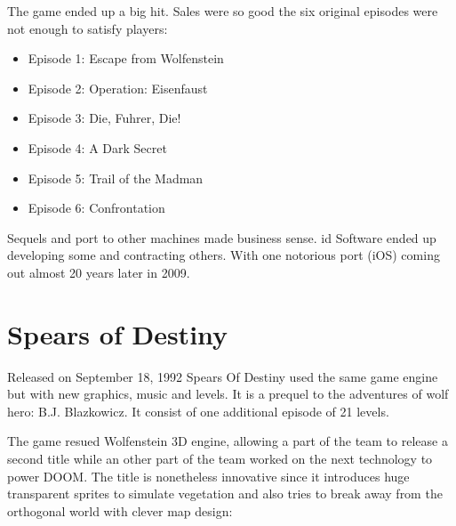 \documentclass[book.tex]{subfiles}
\begin{document}
The game ended up a big hit. Sales were so good the six original episodes were not enough to satisfy players:\\
\par
\begin{itemize}
\item Episode 1: Escape from Wolfenstein\\
\item Episode 2: Operation: Eisenfaust\\
\item Episode 3: Die, Fuhrer, Die!\\
\item Episode 4: A Dark Secret\\
\item Episode 5: Trail of the Madman\\
\item Episode 6: Confrontation\\
\end{itemize}
Sequels and port to other machines made business sense. id Software ended up developing some and contracting others. With one notorious port (iOS) coming out almost 20 years later in 2009.

\section{Spears of Destiny}
Released on September 18, 1992 Spears Of Destiny used the same game engine but with new graphics, music and levels. It is a prequel to the adventures of wolf hero: B.J. Blazkowicz. It consist of one additional episode of 21 levels.\\
   \par
\begin{figure}[H]
\centering
 \end{figure}
 \par
 The game resued Wolfenstein 3D engine, allowing a part of the team to release a second title while an other part of the team worked on the next technology to power DOOM. The title is nonetheless innovative since it introduces huge transparent sprites to simulate vegetation and also tries to break away from the orthogonal world with clever map design:
    \par
\begin{figure}[H]
\centering
 \end{figure}
 \par
\end{document}
